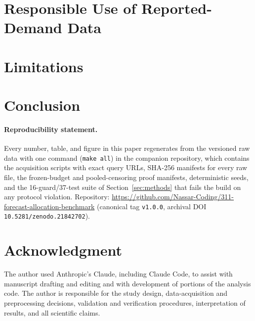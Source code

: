 \documentclass[conference]{IEEEtran}
\begin{document}
\section{Responsible Use of Reported-Demand Data}\label{sec:responsible}


\section{Limitations}\label{sec:limits}


\section{Conclusion}\label{sec:conclusion}


\paragraph*{Reproducibility statement.}
Every number, table, and figure in this paper regenerates from the
versioned raw data with one command (\texttt{make all}) in the companion
repository, which contains the acquisition scripts with exact query URLs,
SHA-256 manifests for every raw file, the frozen-budget and
pooled-censoring proof manifests, deterministic seeds, and the
16-guard/37-test suite of Section~\ref{sec:methods} that fails the build on any protocol
violation. Repository:
\url{https://github.com/Nassar-Coding/311-forecast-allocation-benchmark}
(canonical tag \texttt{v1.0.0}, archival DOI
\texttt{10.5281/zenodo.21842702}).


\section*{Acknowledgment}
The author used Anthropic's Claude, including Claude Code, to assist
with manuscript drafting and editing and with development of portions of
the analysis code. The author is responsible for the study design,
data-acquisition and preprocessing decisions, validation and
verification procedures, interpretation of results, and all scientific
claims.



\end{document}
